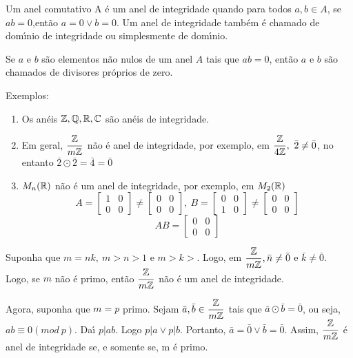 \begin{definicao} Um anel comutativo A {\'e} um anel de integridade quando para todos $a,b\in A$, se $ab=0$,ent{\~a}o $a=0\vee b=0$. Um anel de integridade tamb{\'e}m {\'e} chamado de dom{\'\i}nio de integridade ou simplesmente de dom{\'\i}nio.\end{definicao}

Se $a$ e $b$ s{\~a}o elementos n{\~a}o nulos de um anel $A$ tais que $ab=0$, ent{\~a}o $a$ e $b$ s{\~a}o chamados de divisores pr{\'o}prios de zero.

Exemplos:
\begin{enumerate}
\item Os an{\'e}is $\mathbb{Z},\mathbb{Q},\mathbb{R},\mathbb{C}$ s{\~a}o an{\'e}is de integridade.
\item Em geral, $\displaystyle\frac{\mathbb{Z}}{m\mathbb{Z}}$ n{\~a}o {\'e} anel de integridade, por exemplo, em $\displaystyle\frac{\z}{4\z},\ \bar{2}\neq\bar{0}$, no entanto $\bar{2}\odot\bar{2}=\bar{4}=\bar{0}$
\item $M_{n}(\mathbb{R})$ n{\~a}o {\'e} um anel de integridade, por exemplo, em $M_{2}(\mathbb{R})$\\
\[A=\left[\begin{array}{cc}
1 & 0\\
0 & 0
\end{array}\right]\neq\left[\begin{array}{cc}
0 & 0\\
0 & 0
\end{array}\right],\ B=\left[\begin{array}{cc}
0 & 0\\
1 & 0
\end{array}\right]\neq\left[\begin{array}{cc}
0 & 0\\
0 & 0
\end{array}\right]\]
\[AB=\left[\begin{array}{cc}
0 & 0\\
0 & 0
\end{array}\right]\]

\end{enumerate}

Suponha que $m=nk,\ m>n>1$ e $m>k>$. Logo, em $\displaystyle\frac{\mathbb{Z}}{m\mathbb{Z}}, \bar{n}\neq\bar{0}$ e $\bar{k}\neq\bar{0}$. Logo, se $m$ n{\~a}o {\'e} primo, ent{\~a}o $\displaystyle\frac{\mathbb{Z}}{m\mathbb{Z}}$ n{\~a}o {\'e} um anel de integridade.

Agora, suponha que $m=p$ primo. Sejam $\bar{a},\bar{b}\in\displaystyle\frac{\mathbb{Z}}{m\mathbb{Z}}$ tais que $\bar{a}\odot\bar{b}=\bar{0}$, ou seja, $ab\equiv 0(mod\ p)$. Da{\'\i} $p|ab$. Logo $p|a\vee p|b$. Portanto, $\bar{a}=\bar{0}\vee \bar{b}=\bar{0}$. Assim, $\displaystyle\frac{\mathbb{Z}}{m\mathbb{Z}}$ {\'e} anel de integridade se, e somente se, m {\'e} primo.


